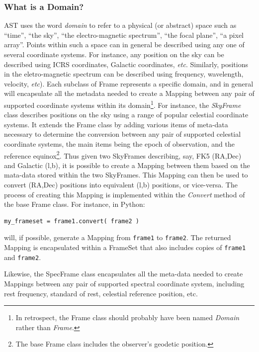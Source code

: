 \documentclass[final,authoryear,5p,times,twocolumn]{elsarticle}
\begin{document}
\subsubsection{What is a Domain?}
AST uses the word \emph{domain} to refer to a physical (or abstract)
space such as ``time'', ``the sky'', ``the electro-magnetic spectrum'',
``the focal plane'', ``a pixel array''. Points within such a space can in
general be described using any one of several coordinate systems. For
instance, any position on the sky can be described using ICRS
coordinates, Galactic coordinates, \emph{etc}. Similarly, positions in
the eletro-magnetic spectrum can be described using frequency,
wavelength, velocity, \emph{etc}). Each subclass of Frame represents a
specific domain, and in general will encapsulate all the metadata needed
to create a Mapping between any pair of supported coordinate systems
within its domain\footnote{In retrospect, the Frame
class should probably have been named \emph{Domain} rather than
\emph{Frame}.}. For instance, the \emph{SkyFrame} class describes positions
on the sky using a range of popular celestial coordinate systems. It extends
the Frame class by adding various items of meta-data necessary to
determine the conversion between any pair of supported celestial coordinate
systems, the main
items being the epoch of observation, and the reference
equinox\footnote{The base Frame class includes the observer's geodetic
position.}. Thus given two SkyFrames describing, say, FK5 (RA,Dec) and
Galactic (l,b), it is possible to create a Mapping between them based on
the mata-data stored within the two SkyFrames. This Mapping can then be
used to convert (RA,Dec) positions into equivalent (l,b) positions, or
vice-versa. The process of creating this Mapping is implemented within
the \emph{Convert} method of the base Frame class. For instance, in
Python:

\begin{lstlisting}
my_frameset = frame1.convert( frame2 )
\end{lstlisting}

will, if possible, generate a Mapping from \texttt{frame1} to
\texttt{frame2}. The returned Mapping is encapsulated within a FrameSet that
also includes copies of \texttt{frame1} and \texttt{frame2}.

Likewise, the SpecFrame class encapsulates all the meta-data needed to
create Mappings between any pair of supported spectral coordinate system,
including rest frequency, standard of rest, celestial reference position,
etc.
\end{document}
